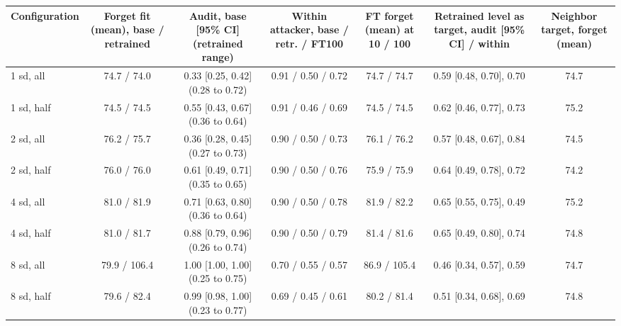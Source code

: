 \begin{tabular}{lcccccc}
\toprule
Configuration & Forget fit (mean), base / retrained & Audit, base [95\% CI] (retrained range) & Within attacker, base / retr. / FT100 & FT forget (mean) at 10 / 100 & Retrained level as target, audit [95\% CI] / within & Neighbor target, forget (mean) \\
\midrule
1 sd, all & 74.7 / 74.0 & 0.33 [0.25, 0.42] (0.28 to 0.72) & 0.91 / 0.50 / 0.72 & 74.7 / 74.7 & 0.59 [0.48, 0.70], 0.70 & 74.7 \\
1 sd, half & 74.5 / 74.5 & 0.55 [0.43, 0.67] (0.36 to 0.64) & 0.91 / 0.46 / 0.69 & 74.5 / 74.5 & 0.62 [0.46, 0.77], 0.73 & 75.2 \\
2 sd, all & 76.2 / 75.7 & 0.36 [0.28, 0.45] (0.27 to 0.73) & 0.90 / 0.50 / 0.73 & 76.1 / 76.2 & 0.57 [0.48, 0.67], 0.84 & 74.5 \\
2 sd, half & 76.0 / 76.0 & 0.61 [0.49, 0.71] (0.35 to 0.65) & 0.90 / 0.50 / 0.76 & 75.9 / 75.9 & 0.64 [0.49, 0.78], 0.72 & 74.2 \\
4 sd, all & 81.0 / 81.9 & 0.71 [0.63, 0.80] (0.36 to 0.64) & 0.90 / 0.50 / 0.78 & 81.9 / 82.2 & 0.65 [0.55, 0.75], 0.49 & 75.2 \\
4 sd, half & 81.0 / 81.7 & 0.88 [0.79, 0.96] (0.26 to 0.74) & 0.90 / 0.50 / 0.79 & 81.4 / 81.6 & 0.65 [0.49, 0.80], 0.74 & 74.8 \\
8 sd, all & 79.9 / 106.4 & 1.00 [1.00, 1.00] (0.25 to 0.75) & 0.70 / 0.55 / 0.57 & 86.9 / 105.4 & 0.46 [0.34, 0.57], 0.59 & 74.7 \\
8 sd, half & 79.6 / 82.4 & 0.99 [0.98, 1.00] (0.23 to 0.77) & 0.69 / 0.45 / 0.61 & 80.2 / 81.4 & 0.51 [0.34, 0.68], 0.69 & 74.8 \\
\bottomrule
\end{tabular}
